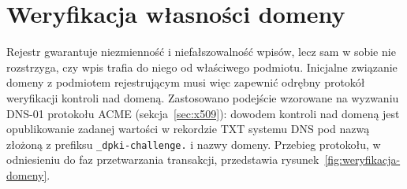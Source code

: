 \section{Weryfikacja własności domeny}
\label{sec:wlasnosc-domeny}

Rejestr gwarantuje niezmienność i niefałszowalność wpisów, lecz sam w sobie nie rozstrzyga, czy wpis trafia do niego od właściwego podmiotu. Inicjalne związanie domeny z podmiotem rejestrującym musi więc zapewnić odrębny protokół weryfikacji kontroli nad domeną. Zastosowano podejście wzorowane na wyzwaniu DNS-01 protokołu ACME (sekcja~\ref{sec:x509}): dowodem kontroli nad domeną jest opublikowanie zadanej wartości w rekordzie TXT systemu DNS pod nazwą złożoną z prefiksu \texttt{\_dpki-challenge.} i nazwy domeny. Przebieg protokołu, w odniesieniu do faz przetwarzania transakcji, przedstawia rysunek~\ref{fig:weryfikacja-domeny}.

